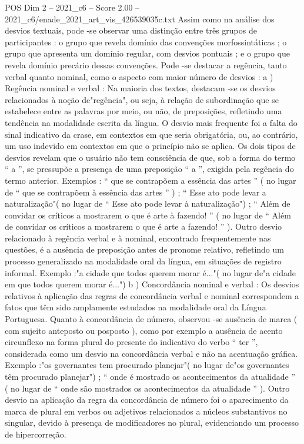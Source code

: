 \begin{textsample}{POS Dim 2 – 2021\_c6 – Score 2.00 – 2021\_c6/enade\_2021\_art\_vis\_426539035c.txt}
Assim como na análise dos desvios textuais, pode -se observar uma distinção entre três grupos de participantes : o grupo que revela domínio das convenções morfossintáticas ; o grupo que apresenta um domínio regular, com desvios pontuais ; e o grupo que revela domínio precário dessas convenções.
Pode -se destacar a regência, tanto verbal quanto nominal, como o aspecto com maior número de desvios : a ) Regência nominal e verbal : Na maioria dos textos, destacam -se os desvios relacionados à noção de"regência", ou seja, à relação de subordinação que se estabelece entre as palavras por meio, ou não, de preposições, refletindo uma tendência na modalidade escrita da língua.
O desvio mais frequente foi a falta do sinal indicativo da crase, em contextos em que seria obrigatória, ou, ao contrário, um uso indevido em contextos em que o princípio não se aplica.
Os dois tipos de desvios revelam que o usuário não tem consciência de que, sob a forma do termo “ a ”, se pressupõe a presença de uma preposição “ a ”, exigida pela regência do termo anterior.
Exemplos : “ que se contrapõem a essência das artes ” ( no lugar de “ que se contrapõem à essência das artes ” ) ; “ Esse ato pode levar a naturalização"( no lugar de “ Esse ato pode levar à naturalização") ; “ Além de convidar os críticos a mostrarem o que é arte à fazendo! ” ( no lugar de “ Além de convidar os críticos a mostrarem o que é arte a fazendo! ” ).
Outro desvio relacionado à regência verbal e à nominal, encontrado frequentemente nas questões, é a ausência de preposição antes de pronome relativo, refletindo um processo generalizado na modalidade oral da língua, em situações de registro informal.
Exemplo :"a cidade que todos querem morar é..."( no lugar de"a cidade em que todos querem morar é...") b ) Concordância nominal e verbal : Os desvios relativos à aplicação das regras de concordância verbal e nominal correspondem a fatos que têm sido amplamente estudados na modalidade oral da Língua Portuguesa.
Quanto à concordância de número, observou -se ausência de marca ( com sujeito anteposto ou posposto ), como por exemplo a ausência de acento circunflexo na forma plural do presente do indicativo do verbo “ ter ”, considerada como um desvio na concordância verbal e não na acentuação gráfica.
Exemplo :"os governantes tem procurado planejar"( no lugar de"os governantes têm procurado planejar") ; “ onde é mostrado os acontecimentos da atualidade ” ( no lugar de “ onde são mostrados os acontecimentos da atualidade ” ).
Outro desvio na aplicação da regra da concordância de número foi o aparecimento da marca de plural em verbos ou adjetivos relacionados a núcleos substantivos no singular, devido à presença de modificadores no plural, evidenciando um processo de hipercorreção.

\end{textsample}
